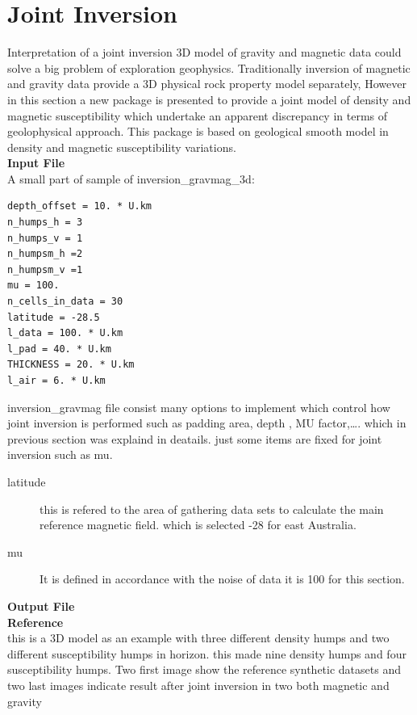 \chapter{Joint Inversion}\label{Chp:cook:joint inversion}


Interpretation of a joint inversion 3D model of gravity and magnetic data could solve a big problem of exploration geophysics. Traditionally inversion of magnetic and gravity data provide a 3D physical rock property model separately, However in this section a new package is presented to provide a joint model of density and magnetic susceptibility which undertake an apparent discrepancy in terms of geolophysical approach. This package is based on geological smooth model in density and magnetic susceptibility variations.\\

\textbf{Input File} \\


A small part of sample of inversion_gravmag_3d:\\
\begin{verbatim}
depth_offset = 10. * U.km
n_humps_h = 3
n_humps_v = 1
n_humpsm_h =2
n_humpsm_v =1
mu = 100.
n_cells_in_data = 30
latitude = -28.5
l_data = 100. * U.km
l_pad = 40. * U.km
THICKNESS = 20. * U.km
l_air = 6. * U.km
\end{verbatim}

inversion_gravmag file consist many options to implement which control how joint inversion is performed such as padding area, depth , MU factor,\ldots. which in previous section was explaind in deatails. just some items are fixed for joint inversion such as mu.\\

\begin{description} 	
\item[latitude]this is refered to the area of gathering data sets to calculate the main reference magnetic field. which is selected -28 for east Australia.


\item[mu]It is defined in accordance with the noise of data it is 100 for this section.

\end{description}

\textbf{Output File}\\


\textbf{Reference}\\

this is a 3D model as an example with three different density humps and two different susceptibility humps in horizon. this made nine density humps and four susceptibility humps. Two first image show the reference synthetic datasets and two last images indicate result after joint inversion in two both magnetic and gravity 
 
